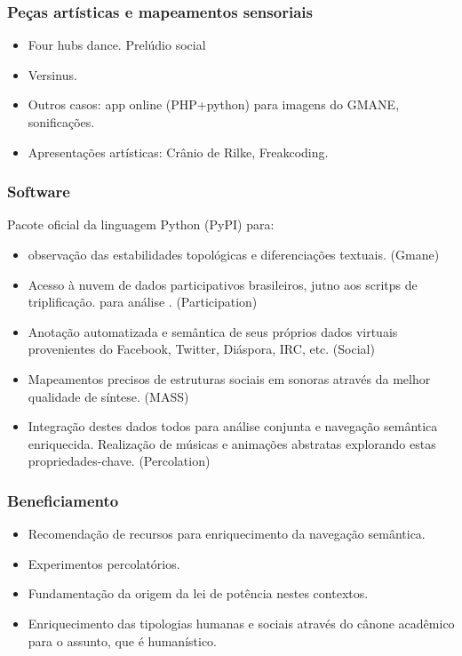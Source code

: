 \documentclass[10pt]{beamer}
\begin{document}
\begin{frame}
\frametitle{Peças artísticas e mapeamentos sensoriais}
\begin{itemize}
	\item Four hubs dance. Prelúdio social
	\item Versinus.
	\item Outros casos: app online (PHP+python) para imagens do GMANE, sonificações.
	\item Apresentações artísticas: Crânio de Rilke, Freakcoding.
\end{itemize}
\end{frame}

\begin{frame}
\frametitle{Software}
Pacote oficial da linguagem Python (PyPI) para:
	\begin{itemize}
		\item observação das estabilidades topológicas e diferenciações textuais. (Gmane)
		\item Acesso à nuvem de dados participativos brasileiros, jutno aos scritps de triplificação. para análise . (Participation)
		\item Anotação automatizada e semântica de seus próprios dados virtuais provenientes do Facebook, Twitter, Diáspora, IRC, etc. (Social)
		\item Mapeamentos precisos de estruturas sociais em sonoras através da melhor qualidade de síntese. (MASS)
		\item Integração destes dados todos para análise conjunta e navegação semântica enriquecida. Realização de músicas e animações abstratas explorando estas propriedades-chave. (Percolation)
	\end{itemize}
\end{frame}

\begin{frame}
\frametitle{Beneficiamento}
\begin{itemize}
	\item Recomendação de recursos para enriquecimento da navegação semântica.
	\item Experimentos percolatórios.
	\item Fundamentação da origem da lei de potência nestes contextos.
	\item Enriquecimento das tipologias humanas e sociais através do cânone acadêmico para o assunto, que é humanístico.
\end{itemize}
\end{frame}
\end{document}
